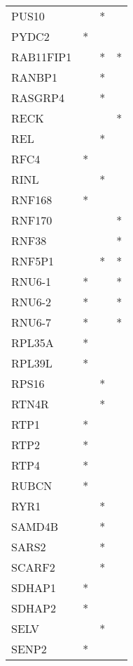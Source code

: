 \begin{longtable}{lccc}
PUS10            &       &  * &         \\
PYDC2            &     * &    &         \\
RAB11FIP1        &       &  * &       * \\
RANBP1           &       &  * &         \\
RASGRP4          &       &  * &         \\
RECK             &       &    &       * \\
REL              &       &  * &         \\
RFC4             &     * &    &         \\
RINL             &       &  * &         \\
RNF168           &     * &    &         \\
RNF170           &       &    &       * \\
RNF38            &       &    &       * \\
RNF5P1           &       &  * &       * \\
RNU6-1           &     * &    &       * \\
RNU6-2           &     * &    &       * \\
RNU6-7           &     * &    &       * \\
RPL35A           &     * &    &         \\
RPL39L           &     * &    &         \\
RPS16            &       &  * &         \\
RTN4R            &       &  * &         \\
RTP1             &     * &    &         \\
RTP2             &     * &    &         \\
RTP4             &     * &    &         \\
RUBCN            &     * &    &         \\
RYR1             &       &  * &         \\
SAMD4B           &       &  * &         \\
SARS2            &       &  * &         \\
SCARF2           &       &  * &         \\
SDHAP1           &     * &    &         \\
SDHAP2           &     * &    &         \\
SELV             &       &  * &         \\
SENP2            &     * &    &         \\

\end{longtable}
